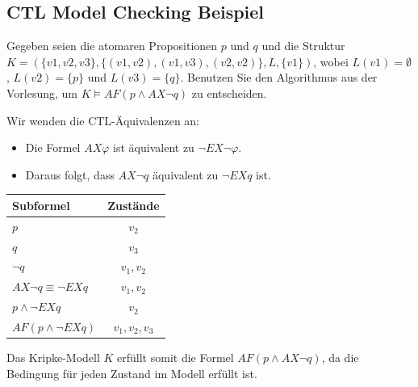 \documentclass[a4paper,6pt]{article}
\begin{document}
\begin{multicols*}{3}
\subsection*{CTL Model Checking Beispiel}

Gegeben seien die atomaren Propositionen \( p \) und \( q \) und die Struktur 
\( K = (\{v1, v2, v3\}, \{(v1, v2), (v1, v3), (v2, v2)\}, L, \{v1\}) \), 
wobei \( L(v1) = \emptyset \), \( L(v2) = \{p\} \) und \( L(v3) = \{q\} \). 
Benutzen Sie den Algorithmus aus der Vorlesung, um \( K \models AF(p \land AX \neg q) \) zu entscheiden.

\begin{center}
\end{center}


Wir wenden die CTL-Äquivalenzen an:
\begin{itemize}
    \item Die Formel \( AX \varphi \) ist äquivalent zu \( \neg EX \neg \varphi \).
    \item Daraus folgt, dass \( AX \neg q \) äquivalent zu \( \neg EX q \) ist.
\end{itemize}

\begin{center}
    \begin{tabular}{l|c}
    Subformel & Zustände \\ \hline
    \( p \) & \( v_2 \) \\
    \( q \) & \( v_3 \) \\
    \( \neg q \) & \( v_1, v_2 \) \\
    \( AX \neg q \equiv \neg EX q \) & \( v_1, v_2 \) \\
    \( p \land \neg EX q \) & \( v_2 \) \\
    \( AF(p \land \neg EX q) \) & \( v_1, v_2, v_3 \) \\
\end{tabular}
\end{center}


Das Kripke-Modell \( K \) erfüllt somit die Formel \( AF(p \land AX \neg q) \), da die Bedingung für jeden Zustand im Modell erfüllt ist.


\end{multicols*}
\end{document}
